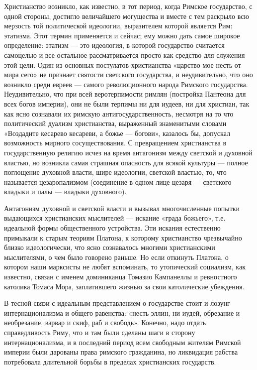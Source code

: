 Христианство  возникло,  как известно,  в  тот  период, когда  Римское
государство,  с  одной  стороны,  достигло  величайшего  могущества  и
вместе  с  тем  раскрыло  всю  мерзость  той  политической  идеологии,
выразителем которой является Рим:  этатизма. Этот термин применяется и
сейчас;  ему можно  дать самое  широкое определение:  этатизм ---  это
идеология, в  которой государство считается самоцелью  и все остальное
рассматривается  просто  как средство  для  служения  этой цели.  Один
из  основных  постулатов  христианства  «царство  мое  несть  от  мира
сего»  не признает  святости светского  государства, и  неудивительно,
что  оно  возникло  среди  евреев  ---  самого  революционного  народа
Римского  государства.  Неудивительно,  что  при  всей  веротерпимости
римлян  (постройка  Пантеона для  всех  богов  империи), они  не  были
терпимы ни  для иудеев,  ни для  христиан, так  как ясно  сознавали их
римскую антигосударственность, несмотря на то что политический дуализм
христианства,  выраженный  знаменитыми   словами  «Воздадите  кесарево
кесареви,  а  божье ---  богови»,  казалось  бы, допускал  возможность
мирного сосуществования. С превращением христианства в государственную
религию исчез на  время антагонизм между светской  и духовной властью,
но возникла  самая страшная опасность  для всякой культуры  --- полное
поглощение  духовной власти,  шире  идеологии,  светской властью,  то,
что  называется цезаропализмом  (соединение  в одном  лице цезаря  ---
светского владыки и палы --- владыки духовного).

Антагонизм духовной и светской власти и вызывал многочисленные попытки
выдающихся христианских  мыслителей --- искание «града  божьего», т.е.
идеальной  формы  общественного  устройства. Эти  искания  естественно
примыкали   к  старым   теориям  Платона,   к  которому   христианство
чрезвычайно  близко   идеологически,  что  ясно   сознавалось  многими
христианскими  мыслителями,  о  чем  было  говорено  раньше.  Но  если
откинуть Платона,  о котором  наши марксисты  не любят  вспоминать, то
утопический  социализм,  как  известно, связан  с  именем  доминиканца
Томазио Кампанеллы  и ревностного  католика Томаса  Мора, заплатившего
жизнью за свои католические убеждения.

В  тесной  связи с  идеальным  представлением  о государстве  стоит  и
лозунг интернационализма  и общего равенства: «несть  эллин, ни иудей,
обрезание и необрезание, варвар и  скиф, раб и свободь». Конечно, надо
отдать  справедливость Риму,  что и  там были  сделаны шаги  в сторону
интернационализма, и в последний период всем свободным жителям Римской
империи были дарованы права римского гражданина, но ликвидация рабства
потребовала длительной борьбы в пределах христианских государств.


